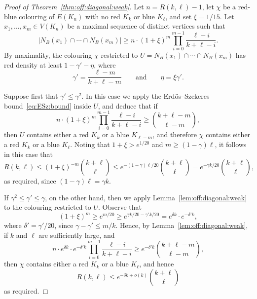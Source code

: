 \documentclass[12pt,reqno]{amsart}
\theoremstyle{definition}
\theoremstyle{remark}
\renewcommand{\le}{\leqslant}
\renewcommand{\ge}{\geqslant}
\begin{document}
\begin{proof}[Proof of Theorem~\ref{thm:off:diagonal:weak}]
Let $n = R(k,\ell) - 1$, let $\chi$ be a red-blue colouring of $E(K_n)$ with no red $K_k$ or blue $K_\ell$, and set $\xi = 1/15$. 
Let $x_1,\ldots,x_m \in V(K_n)$ be a maximal sequence of distinct vertices such that
\begin{equation}\label{eq:after:ESz:steps}
|N_B(x_1) \cap \cdots \cap N_B(x_m)| \ge n \cdot (1 + \xi)^m \prod_{i = 0}^{m-1} \frac{\ell - i}{k + \ell - i}.
\end{equation}
By maximality, the colouring $\chi$ restricted to $U = N_B(x_1) \cap \cdots \cap N_B(x_m)$ has red density at least $1 - \gamma' - \eta$, where 
$$\gamma' = \frac{\ell - m}{k + \ell - m} \qquad \text{and} \qquad \eta = \xi \gamma'.$$

Suppose first that $\gamma' \le \gamma^2$. 
In this case we apply the Erd\H{o}s--Szekeres bound~\eqref{eq:ESz:bound} inside $U$, and deduce that if  
$$n \cdot (1 + \xi)^{m} \prod_{i = 0}^{m-1} \frac{\ell - i}{k + \ell - i} \ge {k + \ell - m \choose \ell - m},$$
then $U$ contains either a red $K_k$ or a blue $K_{\ell-m}$, and therefore $\chi$ contains either a red $K_k$ or a blue $K_\ell$. Noting that $1 + \xi > e^{1/20}$ and $m \ge (1 - \gamma) \ell$, it follows in this case that
$$R(k,\ell) \le (1 + \xi)^{-m} {k + \ell \choose \ell} \le e^{-(1 - \gamma)\ell/20} {k + \ell \choose \ell} = e^{-\gamma k/20} {k + \ell \choose \ell},$$
as required, since $(1 - \gamma) \ell  = \gamma k$. %

If $\gamma^2 \le \gamma' \le \gamma$, %
on the other hand, then we apply Lemma~\ref{lem:off:diagonal:weak} to the colouring restricted to $U$. Observe that 
$$(1+\xi)^{m} \ge e^{m/20} \ge e^{\gamma k/20 - \gamma' k/20} = e^{\delta k} \cdot e^{- \delta' k},$$
where $\delta' = \gamma'/20$, since $\gamma - \gamma' \le m/k$. Hence, by Lemma~\ref{lem:off:diagonal:weak}, if $k$ and $\ell$ are sufficiently large, and
$$n \cdot e^{\delta k} \cdot e^{- \delta' k} \prod_{i = 0}^{m-1} \frac{\ell - i}{k + \ell - i} \ge e^{-\delta' k} {k + \ell - m \choose \ell - m},$$
then $\chi$ contains either a red $K_k$ or a blue $K_\ell$, and hence
$$R(k,\ell) \le e^{-\delta k + o(k)} {k + \ell \choose \ell}$$
as required. 
\end{proof}
\end{document}
